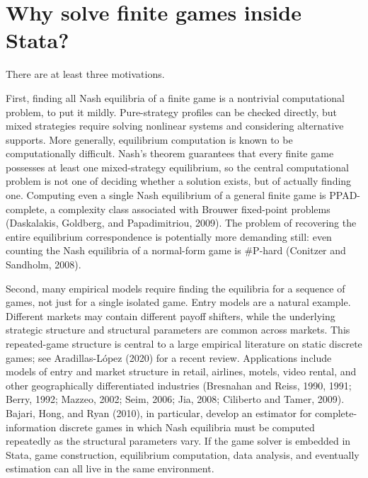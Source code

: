 \documentclass[11pt]{article}
\begin{document}
    \section{Why solve finite games inside
Stata?}\label{why-solve-finite-games-inside-stata}

There are at least three motivations.

First, finding all Nash equilibria of a finite game is a nontrivial
computational problem, to put it mildly. Pure-strategy profiles can be
checked directly, but mixed strategies require solving nonlinear systems
and considering alternative supports. More generally, equilibrium
computation is known to be computationally difficult. Nash's theorem
guarantees that every finite game possesses at least one mixed-strategy
equilibrium, so the central computational problem is not one of deciding
whether a solution exists, but of actually finding one. Computing even a
single Nash equilibrium of a general finite game is PPAD-complete, a
complexity class associated with Brouwer fixed-point problems
(Daskalakis, Goldberg, and Papadimitriou, 2009). The problem of
recovering the entire equilibrium correspondence is potentially more
demanding still: even counting the Nash equilibria of a normal-form game
is \#P-hard (Conitzer and Sandholm, 2008).

Second, many empirical models require finding the equilibria for a
sequence of games, not just for a single isolated game. Entry models are
a natural example. Different markets may contain different payoff
shifters, while the underlying strategic structure and structural
parameters are common across markets. This repeated-game structure is
central to a large empirical literature on static discrete games; see
Aradillas-López (2020) for a recent review. Applications include models
of entry and market structure in retail, airlines, motels, video rental,
and other geographically differentiated industries (Bresnahan and Reiss,
1990, 1991; Berry, 1992; Mazzeo, 2002; Seim, 2006; Jia, 2008; Ciliberto
and Tamer, 2009). Bajari, Hong, and Ryan (2010), in particular, develop
an estimator for complete-information discrete games in which Nash
equilibria must be computed repeatedly as the structural parameters
vary. If the game solver is embedded in Stata, game construction,
equilibrium computation, data analysis, and eventually estimation can
all live in the same environment.
\end{document}
